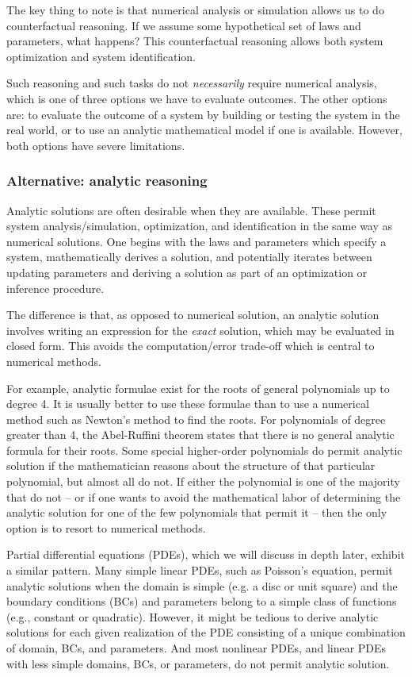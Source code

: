 \documentclass{puthesis}
\begin{document}
The key thing to note is that numerical analysis or simulation allows us to do
counterfactual reasoning.
If we assume some hypothetical set of laws and parameters, what happens?
This counterfactual reasoning allows both system optimization and system identification.

Such reasoning and such tasks do not \emph{necessarily} require numerical analysis,
which is one of three options we have to evaluate outcomes.
The other options are: to evaluate the outcome of a system by building or testing the
system in the real world, or to use an analytic mathematical model
if one is available.
However, both options have severe limitations.

\subsubsection{Alternative: analytic reasoning}
Analytic solutions are often desirable when they are available.
These permit system analysis/simulation, optimization, and identification
in the same way as numerical solutions.
One begins with the laws and parameters which specify a system,
mathematically derives a solution,
and potentially iterates between updating parameters and deriving a solution
as part of an optimization or inference procedure.

The difference is that, as opposed to numerical solution, an analytic solution
involves writing an expression for the \emph{exact} solution,
which may be evaluated in closed form.
This avoids the computation/error trade-off which
is central to numerical methods.

For example, analytic formulae exist for the roots of general polynomials up to degree 4.
It is usually better to use these formulae than to
use a numerical method such as Newton's method to find the roots.
For polynomials of degree greater than 4, the Abel-Ruffini theorem states that there
is no general analytic formula for their roots.
Some special higher-order polynomials do permit analytic solution if the mathematician reasons
about the structure of that particular polynomial, but almost all do not. If either the polynomial is one of the
majority that do not -- or if one wants to avoid the mathematical labor of determining
the analytic solution for one of the few polynomials that permit it -- then the only
option is to resort to numerical methods.

Partial differential equations (PDEs), which we will discuss in depth later, exhibit a
similar pattern.
Many simple linear PDEs, such as Poisson's equation, permit analytic solutions
when the domain is simple (e.g. a disc or unit square) and the boundary conditions (BCs)
and parameters belong to a simple class of functions (e.g., constant or quadratic).
However, it might be tedious to derive analytic solutions for each given realization
 of the PDE consisting of a unique combination of domain, BCs, and parameters.
And most nonlinear PDEs, and
linear PDEs with less simple domains, BCs, or parameters,
do not permit analytic solution.
\end{document}
